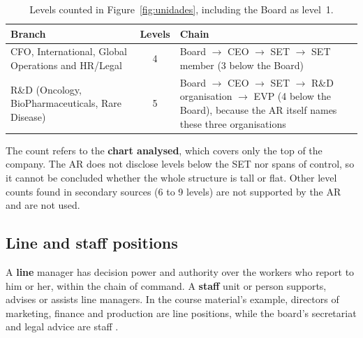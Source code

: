 \begin{table}[H]\centering
\caption{Levels counted in Figure~\ref{fig:unidades}, including the Board as level~1.}
\label{tab:niveis}
\begin{tabularx}{\linewidth}{@{}>{\raggedright\arraybackslash}p{4.2cm}cY@{}}
\toprule
\textbf{Branch} & \textbf{Levels} & \textbf{Chain} \\
\midrule
CFO, International, Global Operations and HR/Legal & 4 & Board $\rightarrow$ CEO $\rightarrow$ SET $\rightarrow$ SET member (3 below the Board) \\
\addlinespace
R\&D (Oncology, BioPharmaceuticals, Rare Disease) & 5 & Board $\rightarrow$ CEO $\rightarrow$ SET $\rightarrow$ R\&D organisation $\rightarrow$ EVP (4 below the Board), because the AR itself names these three organisations \cite[p.~26]{AR} \\
\bottomrule
\end{tabularx}
\end{table}
\begin{sourceslimit}
The count refers to the \textbf{chart analysed}, which covers only the top of the company. The AR does not disclose levels below the SET nor spans of control, so it cannot be concluded whether the whole structure is tall or flat. Other level counts found in secondary sources (6 to 9 levels) are not supported by the AR and are not used.
\end{sourceslimit}

\subsection{Line and staff positions}

A \textbf{line} manager has decision power and authority over the workers who report to him or her, within the chain of command. A \textbf{staff} unit or person supports, advises or assists line managers. In the course material's example, directors of marketing, finance and production are line positions, while the board's secretariat and legal advice are staff \cite[p.~8]{ORG}.

